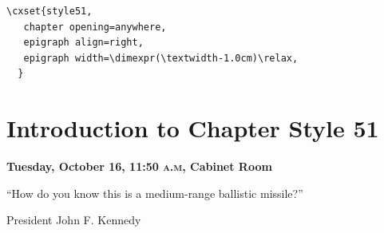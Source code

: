 
\example
\begin{verbatim}
\cxset{style51,
   chapter opening=anywhere,
   epigraph align=right,
   epigraph width=\dimexpr(\textwidth-1.0cm)\relax,
  }
\end{verbatim}

\solution
    
\chapter{Introduction to Chapter Style 51}
\epigraph{\textbf{\sffamily Tuesday, October 16, 11:50 \textsc{a.m}, Cabinet Room}\par
               ``How do you know this is a medium-range ballistic missile?''}{President John F. Kennedy}
\lorem


